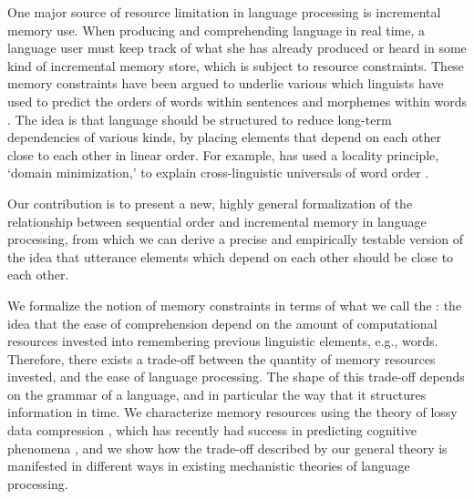 One major source of resource limitation in language processing is incremental memory use. 
When producing and comprehending language in real time, a language user must keep track of what she has already produced or heard in some kind of incremental memory store, which is subject to resource constraints.
These memory constraints have been argued to underlie various  which linguists have used to predict the orders of words within sentences and morphemes within words  \citep{behaghel1932deutsche,rijkhoff-explaining-1990,hawkins-efficiency-2003,hawkins2014crosslinguistic,temperley-minimizing-2018}.
The idea is that language should be structured to reduce long-term dependencies of various kinds, by placing elements that depend on each other close to each other in linear order.
For example, \citet{hawkins-efficiency-2003,hawkins2014crosslinguistic} has used a locality principle, `domain minimization,' to explain cross-linguistic universals of word order \citep[see also][for reviews of this idea and its predictions]{liu-dependency-2017,temperley-minimizing-2018}.

Our contribution is to present a new, highly general formalization of the relationship between sequential order and incremental memory in language processing, from which we can derive a precise and empirically testable version of the idea that utterance elements which depend on each other should be close to each other. 

We formalize the notion of memory constraints in terms of what we call the : the idea that the ease of comprehension %
depend on the amount of computational resources invested into remembering previous linguistic elements, e.g., words. %
Therefore, there exists a trade-off between the quantity of memory resources invested, and the ease of language processing.
The shape of this trade-off depends on the grammar of a language, and in particular the way that it structures information in time.
We characterize memory resources using the theory of lossy data compression \citep{cover2006elements,berger2003rate}, which has recently had success in predicting cognitive phenomena \citep{sims2018efficient,zenon2019information}, and we show how the trade-off described by our general theory is manifested in different ways in existing mechanistic theories of language processing. 

